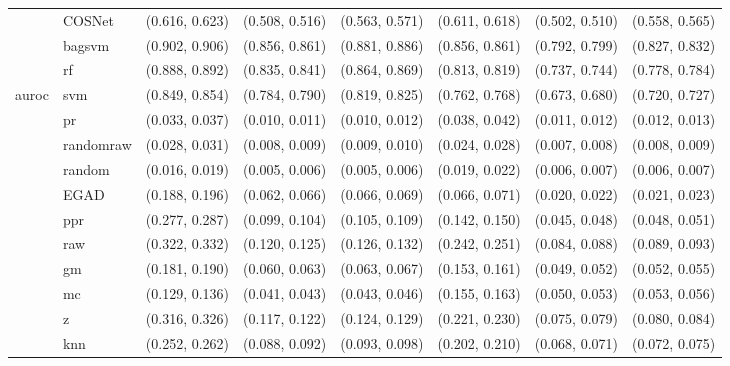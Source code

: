 \begin{table}[H]
{\begin{tabular}{llllllll}
 & COSNet & (0.616, 0.623) & (0.508, 0.516) & (0.563, 0.571) & (0.611, 0.618) & (0.502, 0.510) & (0.558, 0.565)\\

 & bagsvm & (0.902, 0.906) & (0.856, 0.861) & (0.881, 0.886) & (0.856, 0.861) & (0.792, 0.799) & (0.827, 0.832)\\

 & rf & (0.888, 0.892) & (0.835, 0.841) & (0.864, 0.869) & (0.813, 0.819) & (0.737, 0.744) & (0.778, 0.784)\\

\multirow{-15}{*}{\raggedright\arraybackslash auroc} & svm & (0.849, 0.854) & (0.784, 0.790) & (0.819, 0.825) & (0.762, 0.768) & (0.673, 0.680) & (0.720, 0.727)\\
\cmidrule{1-8}
 & pr & (0.033, 0.037) & (0.010, 0.011) & (0.010, 0.012) & (0.038, 0.042) & (0.011, 0.012) & (0.012, 0.013)\\

 & randomraw & (0.028, 0.031) & (0.008, 0.009) & (0.009, 0.010) & (0.024, 0.028) & (0.007, 0.008) & (0.008, 0.009)\\

 & random & (0.016, 0.019) & (0.005, 0.006) & (0.005, 0.006) & (0.019, 0.022) & (0.006, 0.007) & (0.006, 0.007)\\

 & EGAD & (0.188, 0.196) & (0.062, 0.066) & (0.066, 0.069) & (0.066, 0.071) & (0.020, 0.022) & (0.021, 0.023)\\

 & ppr & (0.277, 0.287) & (0.099, 0.104) & (0.105, 0.109) & (0.142, 0.150) & (0.045, 0.048) & (0.048, 0.051)\\

 & raw & (0.322, 0.332) & (0.120, 0.125) & (0.126, 0.132) & (0.242, 0.251) & (0.084, 0.088) & (0.089, 0.093)\\

 & gm & (0.181, 0.190) & (0.060, 0.063) & (0.063, 0.067) & (0.153, 0.161) & (0.049, 0.052) & (0.052, 0.055)\\

 & mc & (0.129, 0.136) & (0.041, 0.043) & (0.043, 0.046) & (0.155, 0.163) & (0.050, 0.053) & (0.053, 0.056)\\

 & z & (0.316, 0.326) & (0.117, 0.122) & (0.124, 0.129) & (0.221, 0.230) & (0.075, 0.079) & (0.080, 0.084)\\

 & knn & (0.252, 0.262) & (0.088, 0.092) & (0.093, 0.098) & (0.202, 0.210) & (0.068, 0.071) & (0.072, 0.075)\\


\end{tabular}}
\end{table}
